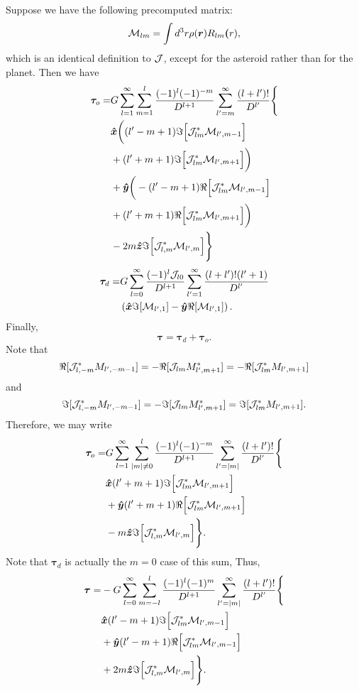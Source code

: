 \documentclass[aps,twocolumn,secnumarabic,balancelastpage,amsmath,amssymb,nofootinbib,floatfix]{revtex4-1}
\begin{document}
Suppose we have the following precomputed matrix:
$$\mathcal{M}_{lm} = \int d^3 r \rho(\bm r) R_{lm} \bm (r),$$
which is an identical definition to $\mathcal{J}$, except for the asteroid rather than for the planet. Then we have
\begin{equation*}
\begin{aligned}
\bm \tau_o = &G\sum_{l=1}^\infty \sum_{m=1}^l \frac{(-1)^l(-1)^{-m}}{D^{l+1}}\sum_{l'=m}^\infty \frac{(l+l')!}{D^{l'}}\Bigg\{\\
&\bm{\hat x}\bigg((l'-m+1)\Im\Big[\mathcal{J}^*_{lm} \mathcal{M}_{l',m-1}\Big]\\
&+(l'+m+1)\Im\Big[\mathcal{J}^*_{lm} \mathcal{M}_{l',m+1}\Big]\bigg)\\
&+\bm{\hat y}\bigg(-(l'-m+1)\Re\Big[\mathcal{J}^*_{lm} \mathcal{M}_{l',m-1}\Big]\\
&+(l'+m+1)\Re\Big[\mathcal{J}^*_{lm} \mathcal{M}_{l',m+1}\Big]\bigg)\\
&-2m\bm{\hat z}\Im\Big[\mathcal{J}_{l,m}^* \mathcal{M}_{l',m}\Big]\Bigg\}
\end{aligned}
\end{equation*}
\begin{equation*}
\begin{aligned}
\bm \tau_d = &G\sum_{l=0}^\infty  \frac{(-1)^l \mathcal{J}_{l0}}{D^{l+1}}\sum_{l'=1}^\infty \frac{(l+l')!(l'+1)}{D^{l'}}\\
& \left( \bm{\hat x}\Im [\mathcal{M}_{l',1}] - \bm{\hat y}\Re [\mathcal{M}_{l',1}] \right).
\end{aligned}
\end{equation*}
Finally,
$$\bm \tau = \bm\tau_d + \bm\tau_o.$$
Note that
$$\Re[\mathcal{J}_{l,-m}^* M_{l',-m-1}]=-\Re[\mathcal{J}_{lm} M^*_{l',m+1}]=-\Re[\mathcal{J}^*_{lm} M_{l',m+1}]$$
and
$$\Im[\mathcal{J}_{l,-m}^* M_{l',-m-1}]=-\Im[\mathcal{J}_{lm} M^*_{l',m+1}]=\Im[\mathcal{J}^*_{lm} M_{l',m+1}].$$
Therefore, we may write
\begin{equation*}
\begin{aligned}
\bm \tau_o = &G\sum_{l=1}^\infty \sum_{|m|\neq 0}^l \frac{(-1)^l(-1)^{-m}}{D^{l+1}}\sum_{l'=|m|}^\infty \frac{(l+l')!}{D^{l'}}\Bigg\{\\
&\bm{\hat x}(l'+m+1)\Im\Big[\mathcal{J}_{lm}^* \mathcal{M}_{l',m+1}\Big]\\
&+\bm{\hat y}(l'+m+1)\Re\Big[\mathcal{J}_{lm}^* \mathcal{M}_{l',m+1}\Big]\\
&-m\bm{\hat z}\Im\Big[\mathcal{J}_{l,m}^* \mathcal{M}_{l',m}\Big]\Bigg\}.
\end{aligned}
\end{equation*}
Note that $\bm \tau_d$ is actually the $m=0$ case of this sum,  Thus,
\begin{equation*}
\begin{aligned}
\bm \tau = &-G\sum_{l=0}^\infty \sum_{m=-l}^l \frac{(-1)^l(-1)^{m}}{D^{l+1}}\sum_{l'=|m|}^\infty \frac{(l+l')!}{D^{l'}}\Bigg\{\\
&\bm{\hat x}(l'-m+1)\Im\Big[\mathcal{J}^*_{lm} \mathcal{M}_{l',m-1}\Big]\\
&+\bm{\hat y}(l'-m+1)\Re\Big[\mathcal{J}^*_{lm} \mathcal{M}_{l',m-1}\Big]\\
&+2m\bm{\hat z}\Im\Big[\mathcal{J}_{l,m}^* \mathcal{M}_{l',m}\Big]\Bigg\}.
\end{aligned}
\end{equation*}
\end{document}
